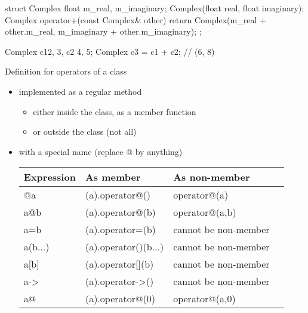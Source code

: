 \begin{frame}[fragile]
  \begin{cppcode}
    struct Complex {
      float m_real, m_imaginary;
      Complex(float real, float imaginary);
      Complex operator+(const Complex& other) {
        return Complex(m_real + other.m_real,
                       m_imaginary + other.m_imaginary);
      }
    };

    Complex c1{2, 3}, c2 {4, 5};
    Complex c3 = c1 + c2; // (6, 8)
  \end{cppcode}
\end{frame}

\begin{frame}
  \begin{block}{Definition for operators of a class}
    \begin{itemize}
    \item implemented as a regular method
      \begin{itemize}
      \item either inside the class, as a member function
      \item or outside the class (not all)
      \end{itemize}
    \item with a special name (replace @ by anything)
      \begin{tabular}{llll}
        Expression & As member & As non-member \\
        \hline
        @a & (a).operator@() & operator@(a) \\
        a@b & (a).operator@(b) & operator@(a,b) \\
        a=b & (a).operator=(b) & cannot be non-member \\
        a(b...) & (a).operator()(b...) & cannot be non-member \\
        a[b] & (a).operator[](b) & cannot be non-member \\
        a-\textgreater & (a).operator-\textgreater() & cannot be non-member \\
        a@ & (a).operator@(0) & operator@(a,0) \\
      \end{tabular}
    \end{itemize}
  \end{block}
\end{frame}

